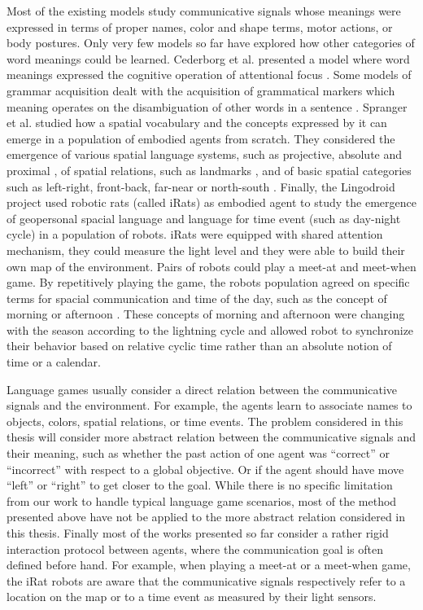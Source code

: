 Most of the existing models study communicative signals whose meanings were expressed in terms of proper names, color and shape terms, motor actions, or body postures. Only very few models so far have explored how other categories of word meanings could be learned. Cederborg et al. presented a model where word meanings expressed the cognitive operation of attentional focus \cite{cederborg2011imitating}. Some models of grammar acquisition dealt with the acquisition of grammatical markers which meaning operates on the disambiguation of other words in a sentence \cite{steels2012fluid}. Spranger et al. studied how a spatial vocabulary and the concepts expressed by it can emerge in a population of embodied agents from scratch. They considered the emergence of various spatial language systems, such as projective, absolute and proximal \cite{spranger2012emergent,spranger2013grounded}, of spatial relations, such as landmarks \cite{spranger2013evolutionary}, and of basic spatial categories such as left-right, front-back, far-near or north-south \cite{spranger2012co}. Finally, the Lingodroid project \cite{schulz2010robots} used robotic rats (called iRats) as embodied agent to study the emergence of geopersonal spacial language and language for time event (such as day-night cycle) in a population of robots. iRats were equipped with shared attention mechanism, they could measure the light level and they were able to build their own map of the environment. Pairs of robots could play a meet-at and meet-when game. By repetitively playing the game, the robots population agreed on specific terms for spacial communication and time of the day, such as the concept of morning or afternoon \cite{schulz2011lingodroids,heath2012long}. These concepts of morning and afternoon were changing with the season according to the lightning cycle and allowed robot to synchronize their behavior based on relative cyclic time rather than an absolute notion of time or a calendar.

Language games usually consider a direct relation between the communicative signals and the environment. For example, the agents learn to associate names to objects, colors, spatial relations, or time events. The problem considered in this thesis will consider more abstract relation between the communicative signals and their meaning, such as whether the past action of one agent was ``correct'' or ``incorrect'' with respect to a global objective. Or if the agent should have move ``left'' or ``right'' to get closer to the goal. While there is no specific limitation from our work to handle typical language game scenarios, most of the method presented above have not be applied to the more abstract relation considered in this thesis. Finally most of the works presented so far consider a rather rigid interaction protocol between agents, where the communication goal is often defined before hand. For example, when playing a meet-at or a meet-when game, the iRat robots are aware that the communicative signals respectively refer to a location on the map or to a time event as measured by their light sensors.

